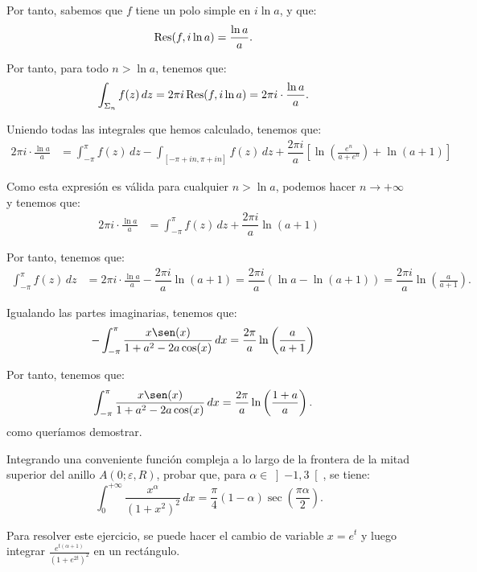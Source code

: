 \begin{ejercicio}
    Por tanto, sabemos que $f$ tiene un polo simple en $i\ln a$, y que:
    \begin{align*}
        \operatorname{Res}(f, i\ln a) &= \frac{\ln a}{a}.
    \end{align*}

    Por tanto, para todo $n > \ln a$, tenemos que:
    \begin{align*}
        \int_{\Sigma_n} f(z) \, dz &= 2\pi i\operatorname{Res}(f, i\ln a) = 2\pi i\cdot \frac{\ln a}{a}.
    \end{align*}

    Uniendo todas las integrales que hemos calculado, tenemos que:
    \begin{align*}
        2\pi i \cdot \frac{\ln a}{a} &= \int_{-\pi}^{\pi} f(z) \, dz - \int_{[-\pi + i n, \pi + i n]} f(z) \, dz + \dfrac{2\pi i}{a}\left[\ln\left(\frac{e^{n}}{a + e^{n}}\right) + \ln(a + 1)\right]
    \end{align*}

    Como esta expresión es válida para cualquier $n > \ln a$, podemos hacer $n \to +\infty$ y tenemos que:
    \begin{align*}
        2\pi i \cdot \frac{\ln a}{a} &= \int_{-\pi}^{\pi} f(z) \, dz + \dfrac{2\pi i}{a}\ln(a + 1)
    \end{align*}

    Por tanto, tenemos que:
    \begin{align*}
        \int_{-\pi}^{\pi} f(z) \, dz &= 2\pi i \cdot \frac{\ln a}{a} - \dfrac{2\pi i}{a}\ln(a + 1)
        = \dfrac{2\pi i}{a}\left(\ln a - \ln(a + 1)\right)
        = \dfrac{2\pi i}{a}\ln\left(\frac{a}{a + 1}\right).
    \end{align*}

    Igualando las partes imaginarias, tenemos que:
    \begin{align*}
        -\int_{-\pi}^{\pi} \frac{x\sen(x)}{1 + a^2 - 2a\cos(x)} \, dx
        &= \dfrac{2\pi}{a}\ln\left(\frac{a}{a + 1}\right)
    \end{align*}

    Por tanto, tenemos que:
    \begin{align*}
        \int_{-\pi}^{\pi} \frac{x\sen(x)}{1 + a^2 - 2a\cos(x)} \, dx
        &= \dfrac{2\pi}{a}\ln\left(\frac{1 + a}{a}\right).
    \end{align*}
    como queríamos demostrar.
\end{ejercicio}

\begin{ejercicio}
    Integrando una conveniente función compleja a lo largo de la frontera de la mitad superior del anillo $A(0; \varepsilon, R)$, probar que, para $\alpha \in \left]-1, 3\right[$, se tiene:
    \begin{equation*}
        \int_0^{+\infty} \frac{x^\alpha}{(1 + x^2)^2} \, dx = \frac{\pi}{4}(1 - \alpha)\sec\left(\frac{\pi \alpha}{2}\right).
    \end{equation*}
    \begin{observacion}
        Para resolver este ejercicio, se puede hacer el cambio de variable $x = e^t$ y luego integrar $\frac{e^{t(\alpha + 1)}}{(1 + e^{2t})^2}$ en un rectángulo.
    \end{observacion}
\end{ejercicio}


